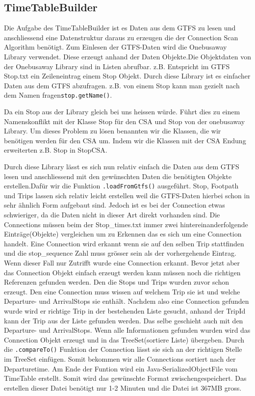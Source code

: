 \subsection{TimeTableBuilder}
Die Aufgabe des TimeTableBuilder ist es Daten aus dem GTFS zu lesen und anschliessend eine Datenstruktur daraus zu erzeugen die der Connection Scan Algorithm benötigt. Zum Einlesen der GTFS-Daten wird die Onebusaway Library verwendet. Diese erzeugt anhand der Daten Objekte.Die Objektdaten von der Onebusaway Library sind in Listen abrufbar.
z.B. Entspricht im GTFS Stop.txt ein Zeileneintrag einem Stop Objekt. Durch diese Library ist es einfacher Daten aus dem GTFS abzufragen. z.B. von einem Stop kann man gezielt nach dem Namen fragen\texttt{stop.getName()}.\newline  

Da ein Stop aus der Library gleich bei uns heissen würde. Führt dies zu einem Namenskonflikt mit der Klasse Stop für den CSA und Stop von der onebusaway Library. Um dieses Problem zu lösen benannten wir die Klassen, die wir benötigen werden für den CSA um. Indem wir die Klassen mit der CSA Endung erweiterten z.B. Stop in StopCSA.\newline

Durch diese Library lässt es sich nun relativ einfach die Daten aus dem GTFS lesen und anschliessend mit den gewünschten Daten die benötigten Objekte erstellen.Dafür wir die Funktion \texttt{.loadFromGtfs()} ausgeführt.  Stop, Footpath und Trips lassen sich relativ leicht erstellen weil die GTFS-Daten hierbei schon in sehr ähnlich Form aufgebaut sind. Jedoch ist es bei der Connection etwas schwieriger, da die Daten nicht in dieser Art direkt vorhanden sind. Die Connections müssen beim der Stop\_times.txt immer zwei hintereinanderfolgende Einträge(Objekte) vergleichen um zu Erkennen das es sich um eine Connection handelt. Eine Connection wird erkannt wenn sie auf den selben Trip stattfinden und die stop\_sequence Zahl muss grösser sein als der vorhergehende Eintrag. Wenn dieser Fall nur Zutrifft wurde eine Connection erkannt. Bevor jetzt aber das Connection Objekt einfach erzeugt werden kann müssen noch die richtigen Referenzen gefunden werden. Den die Stops und Trips wurden zuvor schon erzeugt. Den eine Connection muss wissen auf welchem Trip sie ist und welche Departure- und ArrivalStops sie enthält. Nachdem also eine Connection gefunden wurde wird er richtige Trip in der bestehenden Liste gesucht, anhand der TripId kann der Trip aus der Liste gefunden werden. Das selbe geschieht auch mit den Departure- und ArrivalStops. Wenn alle Informationen gefunden wurden wird das Connection Objekt erzeugt und in das TreeSet(sortiere Liste) übergeben. Durch die \texttt{.compareTo()} Funktion der Connection lässt sie sich an der richtigen Stelle im TreeSet einfügen. Somit bekommen wir alle Connections sortiert nach der Departuretime. Am Ende der Funtion wird ein Java-SerializedObjectFile vom TimeTable erstellt. Somit wird das gewünschte Format zwischengespeichert. Das erstellen dieser Datei benötigt nur 1-2 Minuten und die Datei ist 367MB gross.\newline

